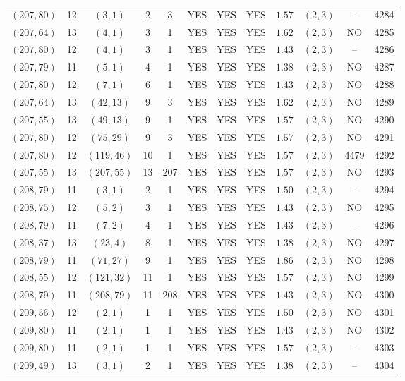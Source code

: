 \begin{longtable}{|c|c|c|c|c|c|c|c|c|c|c|c|}
$(207,80)$ & 12 & $(3,1)$ & 2 & 3 & YES & YES & YES & $1.57$ & $(2,3)$ & -- & 4284\\
$(207,64)$ & 13 & $(4,1)$ & 3 & 1 & YES & YES & YES & $1.62$ & $(2,3)$ & NO & 4285\\
$(207,80)$ & 12 & $(4,1)$ & 3 & 1 & YES & YES & YES & $1.43$ & $(2,3)$ & -- & 4286\\
$(207,79)$ & 11 & $(5,1)$ & 4 & 1 & YES & YES & YES & $1.38$ & $(2,3)$ & NO & 4287\\
$(207,80)$ & 12 & $(7,1)$ & 6 & 1 & YES & YES & YES & $1.43$ & $(2,3)$ & NO & 4288\\
$(207,64)$ & 13 & $(42,13)$ & 9 & 3 & YES & YES & YES & $1.62$ & $(2,3)$ & NO & 4289\\
$(207,55)$ & 13 & $(49,13)$ & 9 & 1 & YES & YES & YES & $1.57$ & $(2,3)$ & NO & 4290\\
$(207,80)$ & 12 & $(75,29)$ & 9 & 3 & YES & YES & YES & $1.57$ & $(2,3)$ & NO & 4291\\
$(207,80)$ & 12 & $(119,46)$ & 10 & 1 & YES & YES & YES & $1.57$ & $(2,3)$ & 4479 & 4292\\
$(207,55)$ & 13 & $(207,55)$ & 13 & 207 & YES & YES & YES & $1.57$ & $(2,3)$ & NO & 4293\\
$(208,79)$ & 11 & $(3,1)$ & 2 & 1 & YES & YES & YES & $1.50$ & $(2,3)$ & -- & 4294\\
$(208,75)$ & 12 & $(5,2)$ & 3 & 1 & YES & YES & YES & $1.43$ & $(2,3)$ & NO & 4295\\
$(208,79)$ & 11 & $(7,2)$ & 4 & 1 & YES & YES & YES & $1.43$ & $(2,3)$ & -- & 4296\\
$(208,37)$ & 13 & $(23,4)$ & 8 & 1 & YES & YES & YES & $1.38$ & $(2,3)$ & NO & 4297\\
$(208,79)$ & 11 & $(71,27)$ & 9 & 1 & YES & YES & YES & $1.86$ & $(2,3)$ & NO & 4298\\
$(208,55)$ & 12 & $(121,32)$ & 11 & 1 & YES & YES & YES & $1.57$ & $(2,3)$ & NO & 4299\\
$(208,79)$ & 11 & $(208,79)$ & 11 & 208 & YES & YES & YES & $1.43$ & $(2,3)$ & NO & 4300\\
$(209,56)$ & 12 & $(2,1)$ & 1 & 1 & YES & YES & YES & $1.50$ & $(2,3)$ & NO & 4301\\
$(209,80)$ & 11 & $(2,1)$ & 1 & 1 & YES & YES & YES & $1.43$ & $(2,3)$ & NO & 4302\\
$(209,80)$ & 11 & $(2,1)$ & 1 & 1 & YES & YES & YES & $1.57$ & $(2,3)$ & -- & 4303\\
$(209,49)$ & 13 & $(3,1)$ & 2 & 1 & YES & YES & YES & $1.38$ & $(2,3)$ & -- & 4304\\

\end{longtable}
